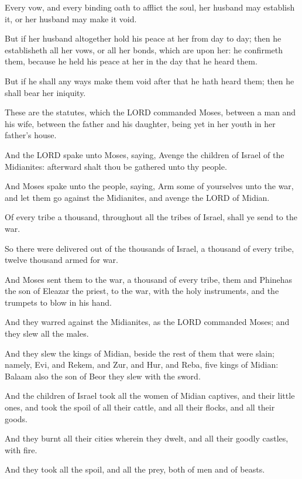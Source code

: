 \Verse Every vow, and every binding oath to afflict the soul, her
husband may establish it, or her husband may make it void.

\Verse But if her husband altogether hold his peace at her from day to
day; then he establisheth all her vows, or all her bonds, which are
upon her: he confirmeth them, because he held his peace at her in the
day that he heard them.

\Verse But if he shall any ways make them void after that he hath heard
them; then he shall bear her iniquity.

\Verse These are the statutes, which the LORD commanded Moses, between
a man and his wife, between the father and his daughter, being yet in
her youth in her father's house.


\Chapter
\Verse And the LORD spake unto Moses, saying, \Verse Avenge the children
of Israel of the Midianites: afterward shalt thou be gathered unto thy
people.

\Verse And Moses spake unto the people, saying, Arm some of yourselves
unto the war, and let them go against the Midianites, and avenge the
LORD of Midian.

\Verse Of every tribe a thousand, throughout all the tribes of Israel,
shall ye send to the war.

\Verse So there were delivered out of the thousands of Israel, a
thousand of every tribe, twelve thousand armed for war.

\Verse And Moses sent them to the war, a thousand of every tribe, them
and Phinehas the son of Eleazar the priest, to the war, with the holy
instruments, and the trumpets to blow in his hand.

\Verse And they warred against the Midianites, as the LORD commanded
Moses; and they slew all the males.

\Verse And they slew the kings of Midian, beside the rest of them that
were slain; namely, Evi, and Rekem, and Zur, and Hur, and Reba, five
kings of Midian: Balaam also the son of Beor they slew with the sword.

\Verse And the children of Israel took all the women of Midian captives,
and their little ones, and took the spoil of all their cattle, and all
their flocks, and all their goods.

\Verse And they burnt all their cities wherein they dwelt, and all
their goodly castles, with fire.

\Verse And they took all the spoil, and all the prey, both of men and
of beasts.

